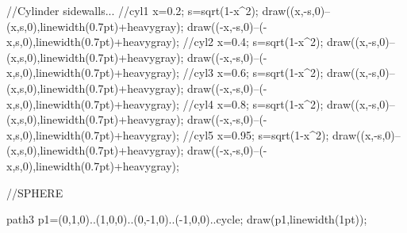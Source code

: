 		
		//Cylinder sidewalls...
		//cyl1
		x=0.2;
		s=sqrt(1-x^2);
		draw((x,-s,0)--(x,s,0),linewidth(0.7pt)+heavygray);		
		draw((-x,-s,0)--(-x,s,0),linewidth(0.7pt)+heavygray);	
		//cyl2
		x=0.4;
		s=sqrt(1-x^2);
		draw((x,-s,0)--(x,s,0),linewidth(0.7pt)+heavygray);		
		draw((-x,-s,0)--(-x,s,0),linewidth(0.7pt)+heavygray);	
		//cyl3
		x=0.6;
		s=sqrt(1-x^2);
		draw((x,-s,0)--(x,s,0),linewidth(0.7pt)+heavygray);		
		draw((-x,-s,0)--(-x,s,0),linewidth(0.7pt)+heavygray);	
		//cyl4
		x=0.8;
		s=sqrt(1-x^2);
		draw((x,-s,0)--(x,s,0),linewidth(0.7pt)+heavygray);		
		draw((-x,-s,0)--(-x,s,0),linewidth(0.7pt)+heavygray);	
		//cyl5
		x=0.95;
		s=sqrt(1-x^2);
		draw((x,-s,0)--(x,s,0),linewidth(0.7pt)+heavygray);		
		draw((-x,-s,0)--(-x,s,0),linewidth(0.7pt)+heavygray);	
			
	//SPHERE

  	path3 p1=(0,1,0)..(1,0,0)..(0,-1,0)..(-1,0,0)..cycle;
  	draw(p1,linewidth(1pt)); 